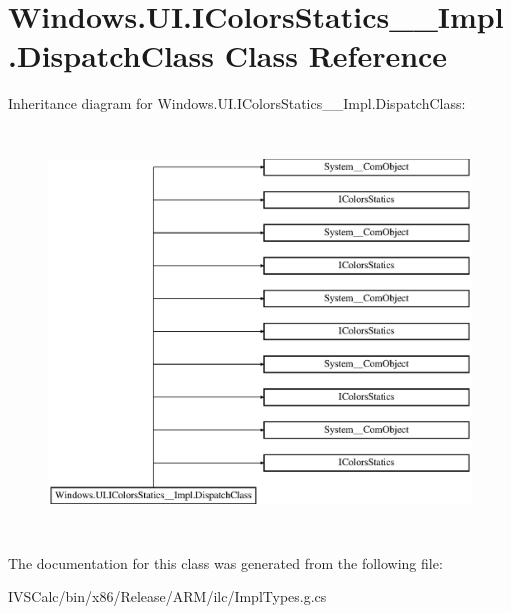 \hypertarget{class_windows_1_1_u_i_1_1_i_colors_statics_____impl_1_1_dispatch_class}{}\section{Windows.\+U\+I.\+I\+Colors\+Statics\+\_\+\+\_\+\+Impl.\+Dispatch\+Class Class Reference}
\label{class_windows_1_1_u_i_1_1_i_colors_statics_____impl_1_1_dispatch_class}
Inheritance diagram for Windows.\+U\+I.\+I\+Colors\+Statics\+\_\+\+\_\+\+Impl.\+Dispatch\+Class\+:\begin{figure}[H]
\begin{center}
\leavevmode
\includegraphics[height=10.769231cm]{class_windows_1_1_u_i_1_1_i_colors_statics_____impl_1_1_dispatch_class}
\end{center}
\end{figure}


The documentation for this class was generated from the following file\+:\begin{DoxyCompactItemize}
\item 
I\+V\+S\+Calc/bin/x86/\+Release/\+A\+R\+M/ilc/Impl\+Types.\+g.\+cs\end{DoxyCompactItemize}
